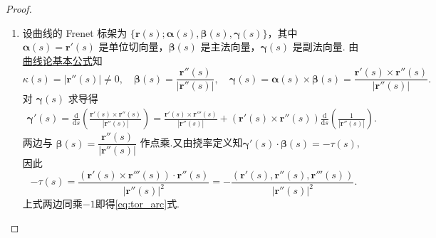 \documentclass[../../main.tex]{subfiles}%
\begin{document}
\begin{proof}
\begin{enumerate}
\item 设曲线的 Frenet 标架为 $\{\bm{r}(s); \bm{\alpha}(s), \bm{\beta}(s), \bm{\gamma}(s)\}$，其中 $\bm{\alpha}(s)=\bm{r}'(s)$ 是单位切向量，$\bm{\beta}(s)$ 是主法向量，$\bm{\gamma}(s)$ 是副法向量. 由\hyperref[theorem:曲线论基本公式]{曲线论基本公式}知
\[
\kappa(s)=|\bm{r}''(s)|\neq 0,\quad \bm{\beta}(s)=\frac{\bm{r}''(s)}{|\bm{r}''(s)|},\quad \bm{\gamma}(s)=\bm{\alpha}(s)\times\bm{\beta}(s)=\frac{\bm{r}'(s)\times\bm{r}''(s)}{|\bm{r}''(s)|}.
\]
对 $\bm{\gamma}(s)$ 求导得
\begin{align*}
\bm{\gamma}'(s)=\frac{\mathrm{d}}{\mathrm{d}s}\left(\frac{\bm{r}'(s)\times\bm{r}''(s)}{|\bm{r}''(s)|}\right)=\frac{\bm{r}'(s)\times\bm{r}'''(s)}{|\bm{r}''(s)|}+(\bm{r}'(s)\times\bm{r}''(s))\frac{\mathrm{d}}{\mathrm{d}s}\left(\frac{1}{|\bm{r}''(s)|}\right).
\end{align*}
两边与 $\bm{\beta}(s)=\dfrac{\bm{r}''(s)}{|\bm{r}''(s)|}$ 作点乘.又由挠率定义知$\bm{\gamma}'(s)\cdot\bm{\beta}(s)=-\tau(s)$,因此
\[
-\tau \left( s \right) =\frac{(\boldsymbol{r}' (s)\times \boldsymbol{r}''' (s))\cdot \boldsymbol{r}'' (s)}{|\boldsymbol{r}'' (s)|^2}=-\frac{(\boldsymbol{r}' (s),\boldsymbol{r}'' (s),\boldsymbol{r}''' (s))}{|\boldsymbol{r}'' (s)|^2}.
\]
上式两边同乘$-1$即得\eqref{eq:tor_arc}式.


\end{enumerate}
\end{proof}
\end{document}
